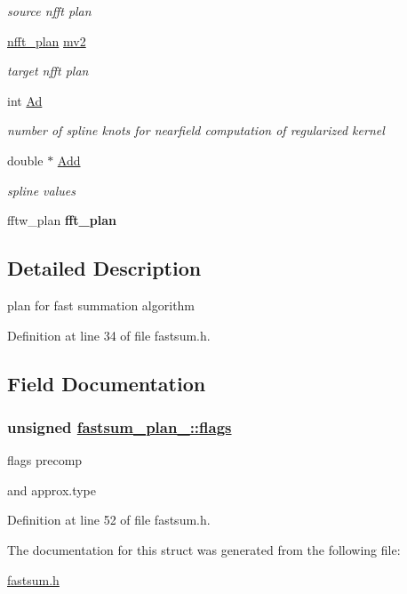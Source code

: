 \begin{CompactItemize}
\begin{CompactList}\small\item\em source nfft plan \item\end{CompactList}\item 
\hypertarget{structfastsum__plan___o17}{
\hyperlink{structnfft__plan}{nfft\_\-plan} \hyperlink{structfastsum__plan___o17}{mv2}}
\label{structfastsum__plan___o17}

\begin{CompactList}\small\item\em target nfft plan \item\end{CompactList}\item 
\hypertarget{structfastsum__plan___o18}{
int \hyperlink{structfastsum__plan___o18}{Ad}}
\label{structfastsum__plan___o18}

\begin{CompactList}\small\item\em number of spline knots for nearfield computation of regularized kernel \item\end{CompactList}\item 
\hypertarget{structfastsum__plan___o19}{
double $\ast$ \hyperlink{structfastsum__plan___o19}{Add}}
\label{structfastsum__plan___o19}

\begin{CompactList}\small\item\em spline values \item\end{CompactList}\item 
\hypertarget{structfastsum__plan___o20}{
fftw\_\-plan {\bf fft\_\-plan}}
\label{structfastsum__plan___o20}

\end{CompactItemize}


\subsection{Detailed Description}
plan for fast summation algorithm 



Definition at line 34 of file fastsum.h.

\subsection{Field Documentation}
\hypertarget{structfastsum__plan___o9}{
\subsubsection[flags]{\setlength{\rightskip}{0pt plus 5cm}unsigned \hyperlink{structfastsum__plan___o9}{fastsum\_\-plan\_\-::flags}}}
\label{structfastsum__plan___o9}


flags precomp 

and approx.type 

Definition at line 52 of file fastsum.h.

The documentation for this struct was generated from the following file:\begin{CompactItemize}
\item 
\hyperlink{fastsum_8h}{fastsum.h}\end{CompactItemize}
